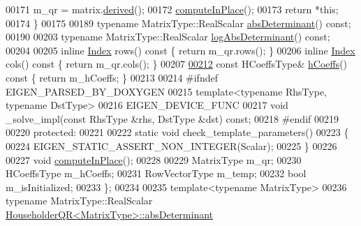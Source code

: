 \begin{DoxyCode}
00171       m\_qr = matrix.\hyperlink{group___core___module_a324b16961a11d2ecfd2d1b7dd7946545}{derived}();
00172       \hyperlink{group___q_r___module_a3a16530338a734971fc45efb0ef9ac94}{computeInPlace}();
00173       \textcolor{keywordflow}{return} *\textcolor{keyword}{this};
00174     \}
00175 
00189     \textcolor{keyword}{typename} MatrixType::RealScalar \hyperlink{group___q_r___module_aaf4ef26c0b7affc91431ec59c92d64c3}{absDeterminant}() \textcolor{keyword}{const};
00190 
00203     \textcolor{keyword}{typename} MatrixType::RealScalar \hyperlink{group___q_r___module_af61b6dbef34fc51c825182b16dc43ca1}{logAbsDeterminant}() \textcolor{keyword}{const};
00204 
00205     \textcolor{keyword}{inline} \hyperlink{namespace_eigen_a62e77e0933482dafde8fe197d9a2cfde}{Index} rows()\textcolor{keyword}{ const }\{ \textcolor{keywordflow}{return} m\_qr.rows(); \}
00206     \textcolor{keyword}{inline} \hyperlink{namespace_eigen_a62e77e0933482dafde8fe197d9a2cfde}{Index} cols()\textcolor{keyword}{ const }\{ \textcolor{keywordflow}{return} m\_qr.cols(); \}
00207     
\hyperlink{group___q_r___module_ae931aa44cde62317b57a9ae661d184be}{00212}     \textcolor{keyword}{const} HCoeffsType& \hyperlink{group___q_r___module_ae931aa44cde62317b57a9ae661d184be}{hCoeffs}()\textcolor{keyword}{ const }\{ \textcolor{keywordflow}{return} m\_hCoeffs; \}
00213     
00214 \textcolor{preprocessor}{    #ifndef EIGEN\_PARSED\_BY\_DOXYGEN}
00215     \textcolor{keyword}{template}<\textcolor{keyword}{typename} RhsType, \textcolor{keyword}{typename} DstType>
00216     EIGEN\_DEVICE\_FUNC
00217     \textcolor{keywordtype}{void} \_solve\_impl(\textcolor{keyword}{const} RhsType &rhs, DstType &dst) \textcolor{keyword}{const};
00218 \textcolor{preprocessor}{    #endif}
00219 
00220   \textcolor{keyword}{protected}:
00221     
00222     \textcolor{keyword}{static} \textcolor{keywordtype}{void} check\_template\_parameters()
00223     \{
00224       EIGEN\_STATIC\_ASSERT\_NON\_INTEGER(Scalar);
00225     \}
00226 
00227     \textcolor{keywordtype}{void} \hyperlink{group___q_r___module_a3a16530338a734971fc45efb0ef9ac94}{computeInPlace}();
00228     
00229     MatrixType m\_qr;
00230     HCoeffsType m\_hCoeffs;
00231     RowVectorType m\_temp;
00232     \textcolor{keywordtype}{bool} m\_isInitialized;
00233 \};
00234 
00235 \textcolor{keyword}{template}<\textcolor{keyword}{typename} MatrixType>
00236 \textcolor{keyword}{typename} MatrixType::RealScalar \hyperlink{group___q_r___module_aaf4ef26c0b7affc91431ec59c92d64c3}{HouseholderQR<MatrixType>::absDeterminant}

\end{DoxyCode}

